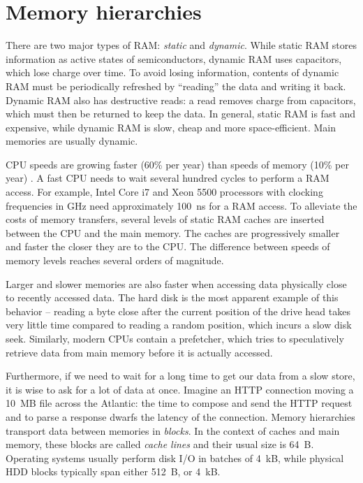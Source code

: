 \section{Memory hierarchies}
There are two major types of RAM: \emph{static} and \emph{dynamic}.
While static RAM stores information as active states of semiconductors, dynamic
RAM uses capacitors, which lose charge over time. To avoid losing information,
contents of dynamic RAM must be periodically refreshed by ``reading'' the data
and writing it back. Dynamic RAM also has destructive reads: a read removes
charge from capacitors, which must then be returned to keep the data.
In general, static RAM is fast and expensive, while dynamic RAM is slow,
cheap and more space-efficient. Main memories are usually dynamic.

CPU speeds are growing faster (60\% per year) than speeds of memory (10\% per
year) \cite{Ailamaki:2004:DAN:1316689.1316801}.
A fast CPU needs to wait several hundred cycles to perform a RAM access.
For example, Intel Core i7 and Xeon 5500 processors with clocking frequencies
in GHz need approximately 100~ns for a RAM access\cite{perf-analysis-guide}.
To alleviate the costs of memory transfers, several levels of static RAM
caches are inserted between the CPU and the main memory. The caches are
progressively smaller and faster the closer they are to the CPU. The difference
between speeds of memory levels reaches several orders of magnitude.

Larger and slower memories are also faster when accessing data physically
close to recently accessed data. The hard disk is the most apparent example
of this behavior -- reading a byte close after the current position of the drive
head takes very little time compared to reading a random position, which incurs
a slow disk seek. %
Similarly, modern CPUs contain a prefetcher, which tries to speculatively
retrieve data from main memory before it is actually accessed.

Furthermore, if we need to wait for a long time to get our data from a slow
store, it is wise to ask for a lot of data at once. Imagine an HTTP connection
moving a 10~MB file across the Atlantic: the time to compose and send the HTTP
request and to parse a response dwarfs the latency of the connection.
Memory hierarchies transport data between memories in \emph{blocks}.
In the context of caches and main memory, these blocks are called
\emph{cache lines} and their usual size is 64~B.
Operating systems usually perform disk I/O in batches of 4~kB,
while physical HDD blocks typically span either 512~B, or 4~kB.

